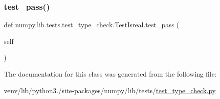 \mbox{\label{classnumpy_1_1lib_1_1tests_1_1test__type__check_1_1TestIsreal_a97a6056d40560ec0c8a6e99d37362966}} 
\subsubsection{\texorpdfstring{test\+\_\+pass()}{test\_pass()}}
{\footnotesize\ttfamily def numpy.\+lib.\+tests.\+test\+\_\+type\+\_\+check.\+Test\+Isreal.\+test\+\_\+pass (\begin{DoxyParamCaption}\item[{}]{self }\end{DoxyParamCaption})}



The documentation for this class was generated from the following file\+:\begin{DoxyCompactItemize}
\item 
venv/lib/python3./site-\/packages/numpy/lib/tests/\hyperlink{test__type__check_8py}{test\+\_\+type\+\_\+check.\+py}\end{DoxyCompactItemize}
